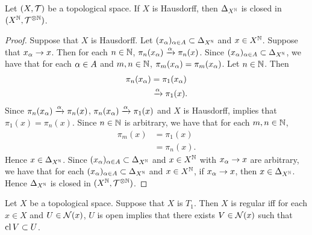 \documentclass{book}
\begin{document}
	\begin{ex} 
		Let $(X, \mathcal{T})$ be a topological space. If $X$ is Hausdorff, then $\Delta_{X^{\mathbb{N}}}$ is closed in $(X^{\mathbb{N}}, \mathcal{T}^{\otimes \mathbb{N}})$.
	\end{ex}

	\begin{proof}
		Suppose that $X$ is Hausdorff. Let $(x_{\alpha})_{\alpha \in A} \subset \Delta_{X^{\mathbb{N}}}$ and $x \in X^{\mathbb{N}}$. Suppose that $x_{\alpha} \rightarrow x$. Then for each $n \in \mathbb{N}$, $\pi_n(x_{\alpha}) \xrightarrow{\alpha} \pi_n(x)$. Since $(x_{\alpha})_{\alpha \in A} \subset \Delta_{X^{\mathbb{N}}}$, we have that for each $\alpha \in A$ and $m,n \in \mathbb{N}$, $\pi_m(x_{\alpha}) = \pi_m(x_{\alpha})$. Let $n \in \mathbb{N}$. Then
		\begin{align*}
			\pi_n(x_{\alpha}) 
			& = \pi_1(x_{\alpha}) \\
			& \xrightarrow{\alpha} \pi_1(x).
		\end{align*}
		Since $\pi_n(x_{\alpha}) \xrightarrow{\alpha} \pi_n(x)$, $\pi_n(x_{\alpha}) \xrightarrow{\alpha} \pi_1(x)$ and $X$ is Hausdorff,  implies that $\pi_1(x) = \pi_n(x)$. Since $n \in \mathbb{N}$ is arbitrary, we have that for each $m,n \in \mathbb{N}$, 
		\begin{align*}
			\pi_m(x)
			& = \pi_1(x) \\
			& = \pi_n(x).
		\end{align*}
		Hence $x \in \Delta_{X^{\mathbb{N}}}$. Since $(x_{\alpha})_{\alpha \in A} \subset \Delta_{X^{\mathbb{N}}}$ and $x \in X^{\mathbb{N}}$ with $x_{\alpha} \rightarrow x$ are arbitrary, we have that for each $(x_{\alpha})_{\alpha \in A} \subset \Delta_{X^{\mathbb{N}}}$ and $x \in X^{\mathbb{N}}$, if $x_{\alpha} \rightarrow x$, then $x \in \Delta_{X^{\mathbb{N}}}$. Hence $\Delta_{X^{\mathbb{N}}}$ is closed in $(X^{\mathbb{N}}, \mathcal{T}^{\otimes \mathbb{N}})$. 
	\end{proof}

	\begin{ex} 
		Let $X$ be a topological space. Suppose that $X$ is $T_1$. Then $X$ is regular iff for each $x \in X$ and $U \in \mathcal{N}(x)$, $U$ is open implies that there exists $V \in \mathcal{N}(x)$ such that $\operatorname{cl} V \subset U$. 
	\end{ex}
\end{document}
